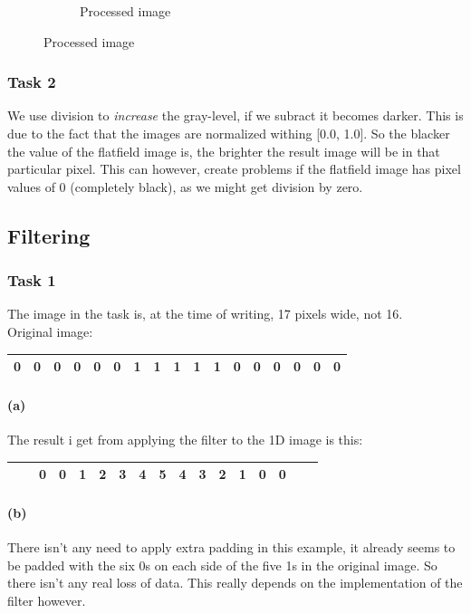 \documentclass{article}
\begin{document}
\begin{figure}[h]
\begin{subfigure}[b]{ 0.45\textwidth}
		\caption{Processed image}
		\label{fig:astro2.png}
	\end{subfigure}
\end{figure}
\subsubsection*{Task 2}
We use division to \emph{increase} the gray-level, if we subract it becomes darker. This is due to the fact that the images are normalized withing [0.0, 1.0]. So the blacker the value of the flatfield image is, the brighter the result image will be in that particular pixel. This can however, create problems if the flatfield image has pixel values of 0 (completely black), as we might get division by zero.


\newpage
\subsection{Filtering}
\subsubsection*{Task 1}
The image in the task is, at the time of writing, 17 pixels wide, not 16.\\ Original image:
\\
\begin{tabular}{|c|c|c|c|c|c|c|c|c|c|c|c|c|c|c|c|c|}
	\hline
	0 & 0 & 0 & 0 & 0 & 0 & 1 & 1 & 1 & 1 & 1 & 0 & 0 & 0 & 0 & 0 & 0 \\ 
	\hline
\end{tabular}
\paragraph{(a)}
The result i get from applying the filter to the 1D image is this:
\\
\begin{tabular}{|c|c|c|c|c|c|c|l|c|c|c|c|c|c|c|c|c|}
	\hline
	  &   & 0 & 0 & 1 & 2 & 3 & 4 & 5 & 4 & 3 & 2 & 1 & 0 & 0 &   &   \\ 
	\hline
\end{tabular}

\paragraph{(b)}
There isn't any need to apply extra padding in this example, it already seems to be padded with the six 0s on each side of the five 1s in the original image. So there isn't any real loss of data. This really depends on the implementation of the filter however.
\end{document}
